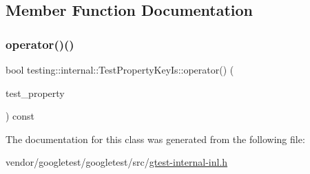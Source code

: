 \subsection{Member Function Documentation}
\mbox{\label{classtesting_1_1internal_1_1_test_property_key_is_abf5eb5bf22065e0614ffe36d093e885e}} 
\subsubsection{\texorpdfstring{operator()()}{operator()()}}
{\footnotesize\ttfamily bool testing\+::internal\+::\+Test\+Property\+Key\+Is\+::operator() (\begin{DoxyParamCaption}\item[{const \hyperlink{classtesting_1_1_test_property}{Test\+Property} \&}]{test\+\_\+property }\end{DoxyParamCaption}) const\hspace{0.3cm}{\ttfamily [inline]}}



The documentation for this class was generated from the following file\+:\begin{DoxyCompactItemize}
\item 
vendor/googletest/googletest/src/\hyperlink{gtest-internal-inl_8h}{gtest-\/internal-\/inl.\+h}\end{DoxyCompactItemize}
